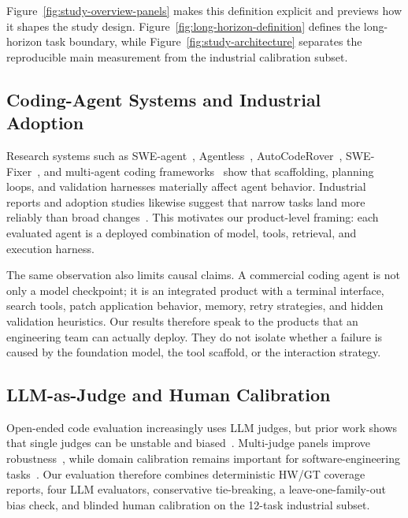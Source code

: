 Figure~\ref{fig:study-overview-panels} makes this definition explicit and previews how it shapes the study design. Figure~\ref{fig:long-horizon-definition} defines the long-horizon task boundary, while Figure~\ref{fig:study-architecture} separates the reproducible main measurement from the industrial calibration subset.



\subsection{Coding-Agent Systems and Industrial Adoption}

Research systems such as SWE-agent~\cite{harness2025}, Agentless~\cite{agentless}, AutoCodeRover~\cite{zhang2024autocoderover}, SWE-Fixer~\cite{xie2025swefixer}, and multi-agent coding frameworks~\cite{li2025swedebate,dong2023selfcollab,costa2026agentspawn} show that scaffolding, planning loops, and validation harnesses materially affect agent behavior. Industrial reports and adoption studies likewise suggest that narrow tasks land more reliably than broad changes~\cite{mathai2024passerine,autobug,logsage,alshahwan2024testgen,watanabe2025agenticgithub,ehsani2026failedprs,robbes2026adoption}. This motivates our product-level framing: each evaluated agent is a deployed combination of model, tools, retrieval, and execution harness.

The same observation also limits causal claims. A commercial coding agent is not only a model checkpoint; it is an integrated product with a terminal interface, search tools, patch application behavior, memory, retry strategies, and hidden validation heuristics. Our results therefore speak to the products that an engineering team can actually deploy. They do not isolate whether a failure is caused by the foundation model, the tool scaffold, or the interaction strategy.

\subsection{LLM-as-Judge and Human Calibration}

Open-ended code evaluation increasingly uses LLM judges, but prior work shows that single judges can be unstable and biased~\cite{gu2024llmjudgesurvey,li2024llmsjudgessurvey,crupi2025llmjudge,thakur2024judgingjudges,jung2024trustescalate}. Multi-judge panels improve robustness~\cite{chen2025multiagentjudge,li2025metajudges,loi2025autobench}, while domain calibration remains important for software-engineering tasks~\cite{wang2025canllmsreplace,zhou2025llmjudgese,wu2024codeeval}. Our evaluation therefore combines deterministic HW/GT coverage reports, four LLM evaluators, conservative tie-breaking, a leave-one-family-out bias check, and blinded human calibration on the 12-task industrial subset.
